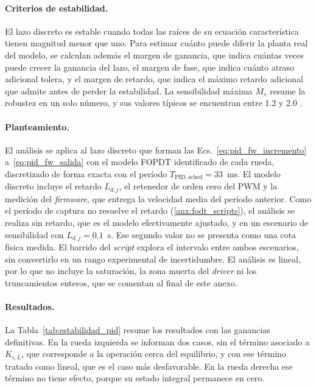 \begin{appendices}
\paragraph{Criterios de estabilidad.} El lazo discreto es estable cuando todas
las raíces de su ecuación característica tienen magnitud menor que uno. Para
estimar cuánto puede diferir la planta real del modelo, se calculan además el
margen de ganancia, que indica cuántas veces puede crecer la ganancia del lazo,
el margen de fase, que indica cuánto atraso adicional tolera, y el margen de
retardo, que indica el máximo retardo adicional que admite antes de perder la
estabilidad. La sensibilidad máxima $M_s$ resume la robustez en un solo número,
y sus valores típicos se encuentran entre 1.2 y 2.0
\citep[Sec.~5]{wittenmark_ifac_computer}.

\paragraph{Planteamiento.} El análisis se aplica al lazo discreto que forman las
Ecs.~\eqref{eq:pid_fw_incremento} a~\eqref{eq:pid_fw_salida} con el modelo FOPDT
identificado de cada rueda, discretizado de forma exacta con el período
$T_{\mathrm{PID,sched}}=33$~ms. El modelo discreto incluye el retardo $L_{d,j}$,
el retenedor de orden cero del PWM y la medición del \textit{firmware}, que
entrega la velocidad media del período anterior. Como el período de captura no
resuelve el retardo (\ref{anx:fodt_scripts}), el análisis se realiza sin
retardo, que es el modelo efectivamente ajustado, y en un escenario de
sensibilidad con $L_{d,j}=0.1$~s. Ese segundo valor no se presenta como una
cota física medida. El barrido del \textit{script} explora el intervalo
entre ambos escenarios, sin convertirlo en un rango experimental de
incertidumbre. El análisis es lineal, por lo que no
incluye la saturación, la zona muerta del \textit{driver} ni los truncamientos
enteros, que se comentan al final de este anexo.

\paragraph{Resultados.} La Tabla~\ref{tab:estabilidad_pid} resume los
resultados con las ganancias definitivas. En la rueda izquierda se informan dos
casos, sin el término asociado a $K_{i,L}$, que corresponde a la operación cerca
del equilibrio, y con ese término tratado como lineal, que es el caso más
desfavorable. En la rueda derecha ese término no tiene efecto, porque su estado
integral permanece en cero.


\end{appendices}
